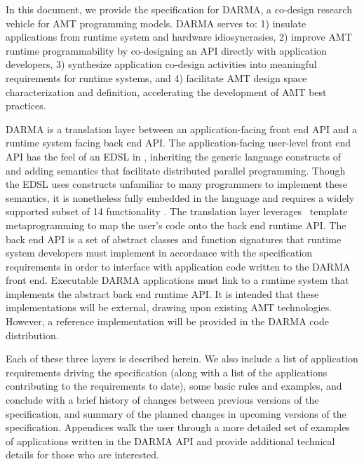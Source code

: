 
In this document, we provide the specification for \gls{DARMA}, 
a co-design research vehicle for \gls{AMT} \glspl{programming model}.
\gls{DARMA} serves to:
1) insulate applications from \gls{runtime system} and hardware idiosyncrasies,
2) improve \gls{AMT} runtime programmability by co-designing an \gls{API} directly with
  application developers, 3) synthesize application \gls{co-design} activities into
  meaningful requirements for \glspl{runtime system}, and 4) 
facilitate \gls{AMT} design space characterization and definition, accelerating the
development of \gls{AMT} best practices.

\gls{DARMA} is a translation layer between an 
application-facing \gls{front end} \gls{API} and a \gls{runtime system} facing \gls{back end} 
\gls{API}.    The application-facing user-level \gls{front end} \gls{API} 
has the feel of an \gls{EDSL} in \CC,  inheriting the generic
language constructs of \CC and adding \gls{semantics} that facilitate
distributed parallel programming. Though the \gls{EDSL} uses
\CC constructs unfamiliar to many programmers to implement these semantics, 
it is nonetheless fully embedded in the \CC language and
requires a widely supported subset of \CC{}14 functionality \compilerReqs.
The \gls{translation layer} leverages \CC\ \gls{template
metaprogramming} to map the user's code onto the \gls{back end} runtime \gls{API}.
The \gls{back end} \gls{API} is a set of abstract classes and function
signatures that \gls{runtime system} developers must implement in accordance with the
specification requirements in order to interface with application code written
to the \gls{DARMA} front end. Executable \gls{DARMA} applications must link to a \gls{runtime
  system} that implements the abstract \gls{back end} runtime \gls{API}.
It is intended that these implementations will be external, drawing upon
existing AMT technologies.  However,  a reference implementation will be provided
in the \gls{DARMA} code distribution.

Each of these three layers is described herein. We also
include a list of application requirements driving the specification (along
with a list of the applications contributing to the requirements to date), some basic rules 
and examples, and conclude with a brief history of changes between previous
versions of the specification, and summary of the planned changes in upcoming
versions of the specification.  Appendices walk the user through a more detailed set
of examples of applications written in the \gls{DARMA} \gls{API} and provide
additional technical details for those who are interested.

